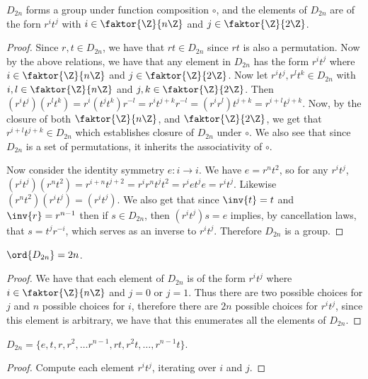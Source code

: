 \begin{theorem}\label{1.3.2}
    $D_{2n}$ forms a group under function composition $\circ$, and the elements
    of $D_{2n}$ are of the forn $r^it^j$ with  $i \in \faktor{\Z}{n\Z}$ and $j
    \in \faktor{\Z}{2\Z}$.
\end{theorem}
\begin{proof}
    Since $r, t \in D_{2n}$, we have that $rt \in D_{2n}$ since $rt$ is also a
    permutation. Now by the above relations, we have that any element in
    $D_{2n}$ has the form $r^it^j$ where  $i \in \faktor{\Z}{n\Z}$ and $j \in
    \faktor{\Z}{2\Z}$. Now let $r^it^j, r^lt^k \in D_{2n}$ with $i,l \in
    \faktor{\Z}{n\Z}$ and $j,k \in \faktor{\Z}{2\Z}$. Then
    $(r^it^j)(r^lt^k)=r^i(t^jt^k)r^{-l}=r^it^{j+k}r^{-l}=(r^ir^l)t^{j+k}=
    r^{i+l}t^{j+k}$. Now, by the closure of both $\faktor{\Z}{n\Z}$, and
    $\faktor{\Z}{2\Z}$, we get that $r^{i+l}t^{j+k} \in D_{2n}$ which
    establishes closure of $D_{2n}$ under $\circ$. We also see that since
    $D_{2n}$ is a set of permutations, it inherits the associativity of $\circ$.

    Now consider the identity symmetry $e:i \rightarrow i$. We have $e=r^nt^2$,
    so for any  $r^it^j$,
    $(r^it^j)(r^nt^2)=r^{i+n}t^{j+2}=r^ir^nt^jt^2=r^iet^je=r^it^j$. Likewise
    $(r^nt^2)(r^it^j)=(r^it^j)$. We also get that since $\inv{t}=t$ and
    $\inv{r}=r^{n-1}$ then if $s \in D_{2n}$, then $(r^it^j)s=e$ implies, by
    cancellation laws, that $s=t^jr^{-i}$, which serves as an inverse to
    $r^it^j$. Therefore  $D_{2n}$ is a group.
\end{proof}
\begin{corollary}
    $\ord{D_{2n}}=2n$.
\end{corollary}
\begin{proof}
    We have that each element of $D_{2n}$ is of the form $r^it^j$ where $i \in
    \faktor{\Z}{n\Z}$ and $j=0$ or $j=1$. Thus there are two possible choices
    for $j$ and  $n$ possible choices for $i$, therefore there are  $2n$
    possible choices for  $r^it^j$, since this element is arbitrary, we have
    that this enumerates all the elements of  $D_{2n}$.
\end{proof}
\begin{corollary}
    $D_{2n}=\{e, t, r, r^2, \dots r^{n-1}, rt, r^2t, \dots, r^{n-1}t\}$.
\end{corollary}
\begin{proof}
    Compute each element  $r^it^j$, iterating over $i$ and  $j$.
\end{proof}

